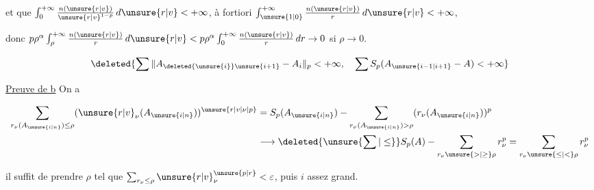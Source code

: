 et que $\int_0^{+\infty}\frac{n(\unsure{r|v})}{\unsure{r|v}^{1-p}}\,d\unsure{r|v}<+\infty$, à fortiori $\int_{\unsure{1|0}}^{+\infty}\frac{n(\unsure{r|v})}{r}\,d\unsure{r|v}<+\infty$,

donc $p\rho^\alpha\int_\rho^{+\infty}\frac{n(\unsure{r|v})}{r}\,d\unsure{r|v}<p\rho^\alpha\int_0^{+\infty}\frac{n(\unsure{r|v})}{r}\,dr\to0$ si $\rho\to0$.

\par\noindent\unsure{\rule{0.95\linewidth}{0.2pt}}\par


\[
\deleted{\sum\|A_{\deleted{\unsure{i}}\unsure{i+1}}-A_i\|_p<+\infty,\quad
\sum S_p(A_{\unsure{i-1|i+1}}-A)<+\infty}
\]


\uline{Preuve de b} On a

\[
\begin{aligned}
\sum_{r_\nu(A_{\unsure{i|n}})\leq\rho}(\unsure{r|v}_\nu(A_{\unsure{i|n}}))^{\unsure{r|v|\nu|p}}&=S_p(A_{\unsure{i|n}})-\sum_{r_\nu(A_{\unsure{i|n}})>\rho}(r_\nu(A_{\unsure{i|n}}))^p\\
&\longrightarrow\deleted{\unsure{\sum|\leq}} S_p(A)-\sum_{r_\nu\unsure{>|\geq}\rho}r_\nu^p=\sum_{r_\nu\unsure{\leq|<}\rho}r_\nu^p
\end{aligned}
\]

il suffit de prendre $\rho$ tel que $\sum_{r_\nu\leq\rho}\unsure{r|v}_\nu^{\unsure{p|r}}<\varepsilon$, puis $i$ assez grand.
